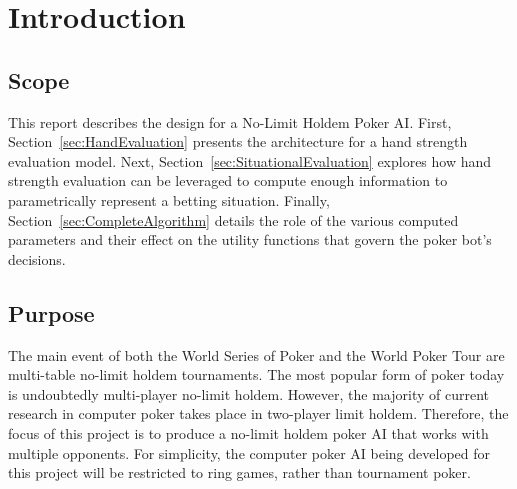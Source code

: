 


\chapter{Introduction}
\label{sec:Intro}

\section{Scope}
\label{sec:Scope}

This report describes the design for a No-Limit Holdem Poker AI.
First, Section~\ref{sec:HandEvaluation} presents the architecture for a hand strength evaluation model.
Next, Section~\ref{sec:SituationalEvaluation} explores how hand strength evaluation can be leveraged to compute enough information to parametrically represent a betting situation.
Finally, Section~\ref{sec:CompleteAlgorithm} details the role of the various computed parameters and their effect on the utility functions that govern the poker bot's decisions.

\section{Purpose}
\label{sec:Purpose}

The main event of both the World Series of Poker and the World Poker Tour are multi-table no-limit holdem tournaments.
The most popular form of poker today is undoubtedly multi-player no-limit holdem.
However, the majority of current research in computer poker takes place in two-player limit holdem.
Therefore, the focus of this project is to produce a no-limit holdem poker AI that works with multiple opponents.
For simplicity, the computer poker AI being developed for this project will be restricted to ring games, rather than tournament poker.



 
